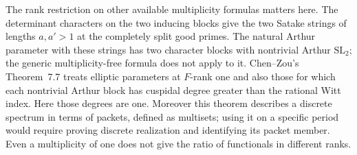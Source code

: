 The rank restriction on other available multiplicity formulas
matters here. The determinant characters on the two inducing blocks
give the two Satake strings of lengths \(a,a'>1\) at the completely
split good primes. The natural Arthur parameter with these strings
has two character blocks with nontrivial Arthur \(\mathrm{SL}_2\);
the generic multiplicity-free formula does not apply to it.
Chen--Zou's Theorem~7.7 treats elliptic parameters at \(F\)-rank
one and also those for which each nontrivial Arthur block has
cuspidal degree greater than the rational Witt index. Here those
degrees are one. Moreover this theorem describes a discrete
spectrum in terms of packets, defined as multisets; using it on a
specific period would require proving discrete realization and
identifying its packet member. Even a multiplicity of one does not
give the ratio of functionals in different ranks.
\cite[\S5.3, Assumption~7.2 and Theorem~7.7]{chenZouMultiplicity}

